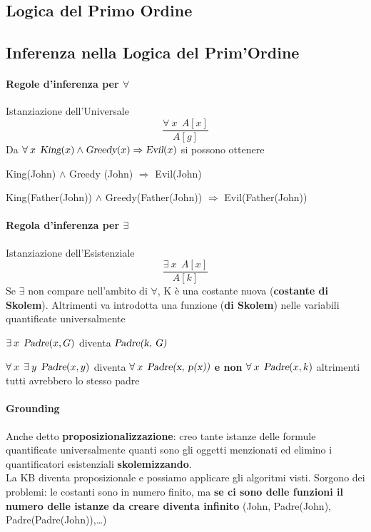 \documentclass[10pt]{book}
\begin{document}
\subsection{Logica del Primo Ordine}
\subsection{Inferenza nella Logica del Prim'Ordine}
\paragraph{Regole d'inferenza per $\forall$} Istanziazione dell'Universale
$$\frac{\forall\:x\:\:A[x]}{A[g]}$$
Da $\forall\:x\:\:\textsl{King}(x) \wedge \textsl{Greedy}(x) \Rightarrow \textsl{Evil}(x)$ si possono ottenere
\begin{list}{}{}
	\item King(John) $\wedge$ Greedy (John) $\Rightarrow$ Evil(John)
	\item King(Father(John)) $\wedge$ Greedy(Father(John)) $\Rightarrow$ Evil(Father(John))
\end{list}

\paragraph{Regola d'inferenza per $\exists$} Istanziazione dell'Esistenziale
$$\frac{\exists\:x\:\:A[x]}{A[k]}$$
Se $\exists$ non compare nell'ambito di $\forall$, K è una costante nuova (\textbf{costante di Skolem}). Altrimenti va introdotta una funzione (\textbf{di Skolem}) nelle variabili quantificate universalmente
\begin{list}{}{}
	\item $\exists\: x\:\:\textsl{Padre}(x, G)$ diventa $\textsl{Padre(k, G)}$
	\item $\forall\: x\:\:\exists\: y\:\:\textsl{Padre}(x, y)$ diventa $\forall\: x\:\:\textsl{Padre(x, p(x))}$ \textbf{e non} $\forall\: x\:\:\textsl{Padre}(x, k)$ altrimenti tutti avrebbero lo stesso padre
\end{list}
\paragraph{Grounding} Anche detto \textbf{proposizionalizzazione}: creo tante istanze delle formule quantificate universalmente quanti sono gli oggetti menzionati ed elimino i quantificatori esistenziali \textbf{skolemizzando}.\\
La KB diventa proposizionale e possiamo applicare gli algoritmi visti. Sorgono dei problemi: le costanti sono in numero finito, ma \textbf{se ci sono delle funzioni il numero delle istanze da creare diventa infinito} (John, Padre(John), Padre(Padre(John)),\ldots)
\end{document}

